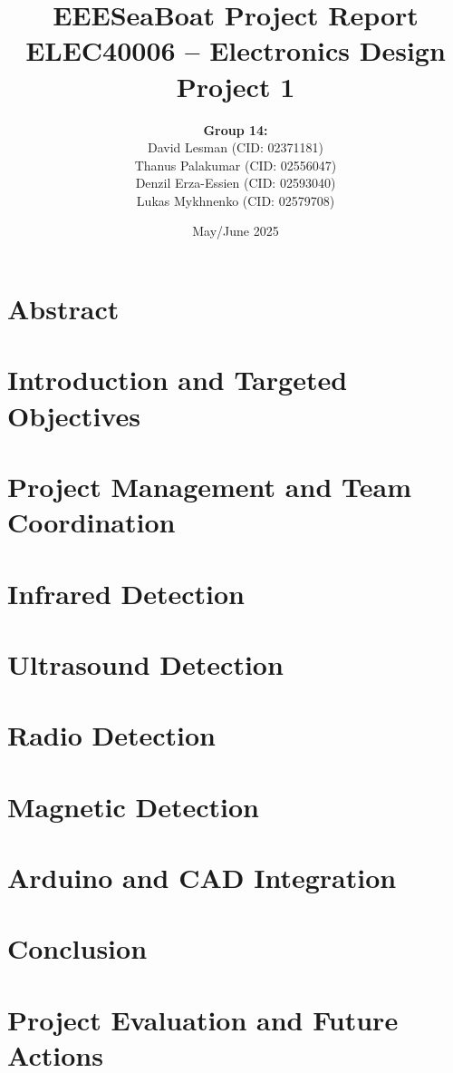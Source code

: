 \documentclass[12pt,a4paper]{report}
\title{\textbf{EEESeaBoat Project Report} \\ \large ELEC40006 -- Electronics Design Project 1}
\author{
\textbf{Group 14:} \\ David Lesman (CID: 02371181) \\ Thanus Palakumar (CID: 02556047) \\ Denzil Erza-Essien (CID: 02593040) \\ Lukas Mykhnenko (CID: 02579708)
}
\date{May/June 2025}
\begin{document}
\maketitle
\tableofcontents
\newpage

\chapter{Abstract}


\chapter{Introduction and Targeted Objectives}

\chapter{Project Management and Team Coordination}


\chapter{Infrared Detection}


\chapter{Ultrasound Detection}


\chapter{Radio Detection}


\chapter{Magnetic Detection}


\chapter{Arduino and CAD Integration}


\chapter{Conclusion}


\chapter{Project Evaluation and Future Actions}

\end{document}
